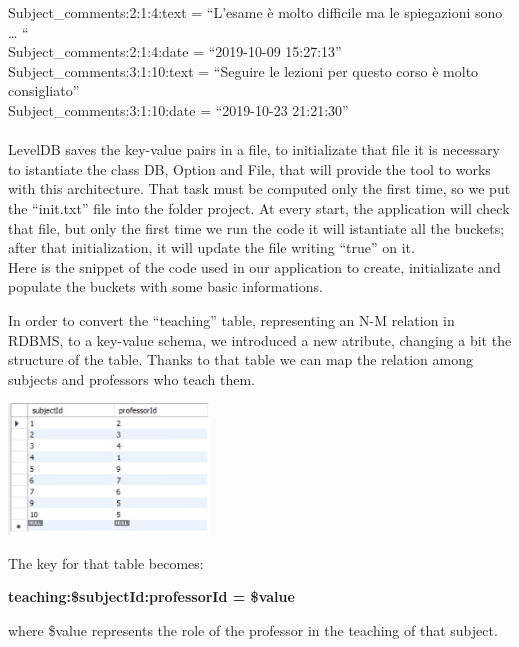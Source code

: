 \documentclass[a4paper, oneside]{article}
\begin{document}
Subject\_comments:2:1:4:text = “L’esame è molto difficile ma le spiegazioni sono  … “\\
Subject\_comments:2:1:4:date = “2019-10-09 15:27:13”\\
Subject\_comments:3:1:10:text = “Seguire le lezioni per questo corso è molto consigliato”\\
Subject\_comments:3:1:10:date = “2019-10-23 21:21:30”\\
\vspace{2mm} \\
LevelDB saves the key-value pairs in a file, to initializate that file it is necessary to istantiate the class DB, Option and File, that will provide the tool to works with this architecture. That task must be computed only the first time, so we put the “init.txt” file into the folder project. At every start, the application will check that file, but only the first time we run the code it will istantiate all the buckets; after that initialization, it will update the file writing “true” on it.\\
Here is the snippet of the code used in our application to create, initializate and populate the buckets with some basic informations.
\vspace{3mm}

\vspace{5mm}
In order to convert the “teaching” table, representing an N-M relation in RDBMS, to a key-value schema, we introduced a new atribute, changing a bit the structure of the table. Thanks to that table we can map the relation among subjects and professors who teach them.\\
\begin{minipage}{\linewidth}
\begin{center}
\vspace{4mm}
\includegraphics[width = 0.4\textwidth]{./images/table/teaching.jpg} 
\vspace{2mm}
\label{fig:teachingTable}
\end{center}
\vspace{3mm}
\end{minipage}
The key for that table becomes:
\begin{center}
\textbf{teaching:\$subjectId:professorId = \$value}
\end{center}
where \$value represents the role of the professor in the teaching of that subject.
\end{document}
